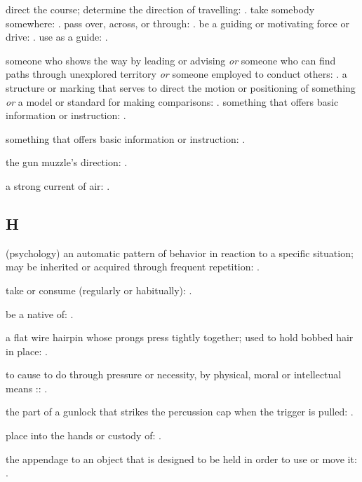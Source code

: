   direct the course; determine the direction of travelling: . take somebody somewhere: . pass over, across, or through: . be a guiding or motivating force or drive: . use as a guide: .

  someone who shows the way by leading or advising \textit{or} someone who can find paths through unexplored territory \textit{or} someone employed to conduct others: . a structure or marking that serves to direct the motion or positioning of something \textit{or} a model or standard for making comparisons: . something that offers basic information or instruction: .

  something that offers basic information or instruction: .

  the gun muzzle's direction: .

  a strong current of air: .

\subsection*{H}

  (psychology) an automatic pattern of behavior in reaction to a specific situation; may be inherited or acquired through frequent repetition: .

  take or consume (regularly or habitually): .

  be a native of: .

  a flat wire hairpin whose prongs press tightly together; used to hold bobbed hair in place: .

  to cause to do through pressure or necessity, by physical, moral or intellectual means :: .

  the part of a gunlock that strikes the percussion cap when the trigger is pulled: .

  place into the hands or custody of: .

  the appendage to an object that is designed to be held in order to use or move it: .

